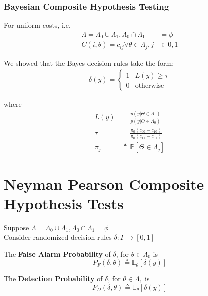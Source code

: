\documentclass[12pt]{report}
\begin{document}
\subsubsection{Bayesian Composite Hypothesis Testing}

\noindent For uniform costs, i.e,
\begin{align*}
    \Lambda = \Lambda_0 \cup \Lambda_1, \Lambda_0 \cap \Lambda_1 &= \phi \\
    C(i,\theta) = c_{ij} \forall \theta \in \Lambda_j, j &\in {0,1}    
\end{align*}

We showed that the Bayes decision rules take the form:
\begin{align*}
    \delta(y)=\begin{cases}
    1 &L(y) \geq \tau \\
    0 & \text{otherwise}
    \end{cases}
\end{align*}

where
\begin{align*}
    L(y) &= \frac{p(y|\Theta \in \Lambda_1)}{p(y|\Theta \in \Lambda_0)} \\
    \tau &= \frac{\pi_{0}(c_{00}-c_{10})}{\pi_{0}(c_{11}-c_{01})}\\
    \pi_j &\triangleq \mathbb{P}[\Theta \in \Lambda_j]
\end{align*}


\section{Neyman Pearson Composite Hypothesis Tests}

Suppose $\Lambda = \Lambda_0 \cup \Lambda_1, \Lambda_0 \cap \Lambda_1 = \phi $\\
Consider randomized decision rules $\delta: \Gamma \to [0, 1]$

\begin{defn}
The \textbf{False Alarm Probability} of $\delta$, for $\theta \in \Lambda_0$ is
\begin{equation}
    P_F(\delta,\theta) \triangleq \mathbb{E}_{\theta}[\delta(y)]
\end{equation}    


\end{defn}

\begin{defn}
The \textbf{Detection Probability} of $\delta$, for $\theta \in \Lambda_1$ is
\begin{equation}
    P_D(\delta,\theta) \triangleq \mathbb{E}_{\theta}[\delta(y)]
\end{equation}    


\end{defn}
\end{document}
